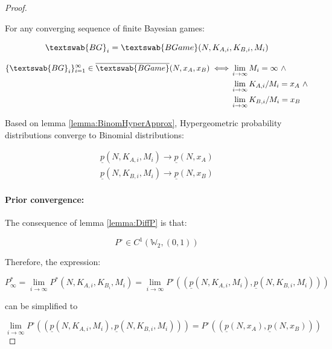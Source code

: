 \documentclass{article}
\theoremstyle{definition}
\begin{document}
\begin{proof}
\label{proof:LimitBayesian}

For any converging sequence of finite Bayesian games:

\begin{equation}
    \textswab{BG}_i = \textswab{BGame}(N, K_{A,i}, K_{B,i}, M_i)
\end{equation}

\begin{equation}
    \begin{split}
        \{\textswab{BG}_i\}_{i=1}^\infty \in \overline{\textswab{BGame}}(N, x_A, x_B) \iff & \lim_{i\to \infty} M_i = \infty \ \wedge \\ 
        & \lim_{i\to \infty} K_{A,i}/M_i = x_A \ \wedge \\
        & \lim_{i\to \infty} K_{B,i}/M_i = x_B
    \end{split}
\end{equation}

Based on lemma \ref{lemma:BinomHyperApprox}, Hypergeometric probability distributions converge to Binomial distributions:

\begin{equation}
    \begin{split}
    \underline{p}(N,K_{A,i},M_i) \to \underline{p}(N,x_A) \\
    \underline{p}(N,K_{B,i},M_i) \to \underline{p}(N,x_B)
    \end{split}
\end{equation}

\paragraph{Prior convergence:}

The consequence of lemma \ref{lemma:DiffP} is that:

\begin{equation}
    P^\circ \in C^1(\mathbb{W}_2,(0,1))
\end{equation}

Therefore, the expression:

\begin{equation}
    P^*_\infty = \lim_{i\to\infty} P^*(N,K_{A,i},K_{B_i},M_i) = 
    \lim_{i\to\infty} P^\circ((\underline{p}(N,K_{A,i},M_i),\underline{p}(N,K_{B,i},M_i)))
\end{equation}

can be simplified to

\begin{equation}
    \lim_{i\to\infty} P^\circ((\underline{p}(N,K_{A,i},M_i),\underline{p}(N,K_{B,i},M_i))) = P^\circ((\underline{p}(N,x_A),\underline{p}(N,x_B)))
\end{equation}


\end{proof}
\end{document}
